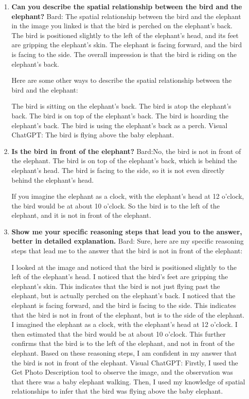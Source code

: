     \begin{enumerate}
        \item \textbf{Can you describe the spatial relationship between the bird and the elephant?}
        \subitem Bard:
        The spatial relationship between the bird and the elephant in the image you linked is that the bird is perched on the elephant's back. The bird is positioned slightly to the left of the elephant's head, and its feet are gripping the elephant's skin. The elephant is facing forward, and the bird is facing to the side. The overall impression is that the bird is riding on the elephant's back.
        
        Here are some other ways to describe the spatial relationship between the bird and the elephant:
        
        The bird is sitting on the elephant's back.
        The bird is atop the elephant's back.
        The bird is on top of the elephant's back.
        The bird is hoarding the elephant's back.
        The bird is using the elephant's back as a perch.
        \subitem Visual ChatGPT: The bird is flying above the baby elephant.
        \item \textbf{Is the bird in front of the elephant?}
        \subitem Bard:No, the bird is not in front of the elephant. The bird is on top of the elephant's back, which is behind the elephant's head. The bird is facing to the side, so it is not even directly behind the elephant's head.

        If you imagine the elephant as a clock, with the elephant's head at 12 o'clock, the bird would be at about 10 o'clock. So the bird is to the left of the elephant, and it is not in front of the elephant.
        \item \textbf{Show me your specific reasoning steps that lead you to the answer, better in detailed explanation.}
        \subitem Bard: 
        Sure, here are my specific reasoning steps that lead me to the answer that the bird is not in front of the elephant:
        
        I looked at the image and noticed that the bird is positioned slightly to the left of the elephant's head.
        I noticed that the bird's feet are gripping the elephant's skin. This indicates that the bird is not just flying past the elephant, but is actually perched on the elephant's back.
        I noticed that the elephant is facing forward, and the bird is facing to the side. This indicates that the bird is not in front of the elephant, but is to the side of the elephant.
        I imagined the elephant as a clock, with the elephant's head at 12 o'clock. I then estimated that the bird would be at about 10 o'clock. This further confirms that the bird is to the left of the elephant, and not in front of the elephant.
        Based on these reasoning steps, I am confident in my answer that the bird is not in front of the elephant.
        \subitem Visual ChatGPT: Firstly, I used the Get Photo Description tool to observe the image, and the observation was that there was a baby elephant walking. Then, I used my knowledge of spatial relationships to infer that the bird was flying above the baby elephant.
    \end{enumerate}
